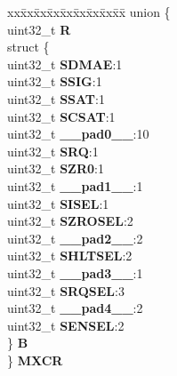 \begin{DoxyCompactItemize}
\begin{tabbing}
\end{tabbing}\item 
\mbox{\label{structDECFIL__tag_a5e4d44e0e4fb5710a3a18d41552705bb}} 
\begin{tabbing}
xx\=xx\=xx\=xx\=xx\=xx\=xx\=xx\=xx\=\kill
union \{\\
\>uint32\_t {\bfseries R}\\
\>struct \{\\
\>\>uint32\_t {\bfseries SDMAE}:1\\
\>\>uint32\_t {\bfseries SSIG}:1\\
\>\>uint32\_t {\bfseries SSAT}:1\\
\>\>uint32\_t {\bfseries SCSAT}:1\\
\>\>uint32\_t {\bfseries \_\_pad0\_\_}:10\\
\>\>uint32\_t {\bfseries SRQ}:1\\
\>\>uint32\_t {\bfseries SZR0}:1\\
\>\>uint32\_t {\bfseries \_\_pad1\_\_}:1\\
\>\>uint32\_t {\bfseries SISEL}:1\\
\>\>uint32\_t {\bfseries SZROSEL}:2\\
\>\>uint32\_t {\bfseries \_\_pad2\_\_}:2\\
\>\>uint32\_t {\bfseries SHLTSEL}:2\\
\>\>uint32\_t {\bfseries \_\_pad3\_\_}:1\\
\>\>uint32\_t {\bfseries SRQSEL}:3\\
\>\>uint32\_t {\bfseries \_\_pad4\_\_}:2\\
\>\>uint32\_t {\bfseries SENSEL}:2\\
\>\} {\bfseries B}\\
\} {\bfseries MXCR}\\


\end{tabbing}
\end{DoxyCompactItemize}
